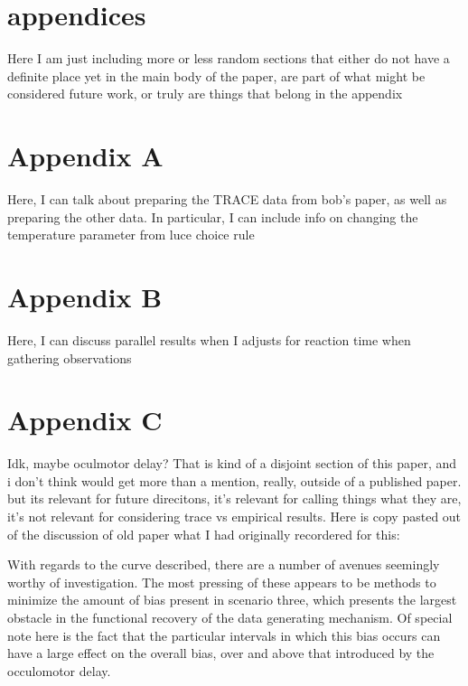\documentclass{article}
\begin{document}

\section{appendices}

Here  I am just including more or less random sections that either do not have a definite place yet in the main body of the paper, are part of what might be considered future work, or truly are things that belong in the appendix

\section*{Appendix A}
Here, I can talk about preparing the TRACE data from bob's paper, as well as preparing the other data. In particular, I can include info on changing the temperature parameter from luce choice rule

\section*{Appendix B}

Here, I can discuss parallel results when I adjusts for reaction time when gathering observations

\section*{Appendix C}

Idk, maybe oculmotor delay? That is kind of a disjoint section of this paper, and i don't think would get more than a mention, really, outside of a published paper. but its relevant for future direcitons, it's relevant for calling things what they are, it's not relevant for considering trace vs empirical results. Here is copy pasted out of the discussion of old paper what I had originally recordered for this:

With regards to the curve described, there are a number of avenues seemingly worthy of investigation. The most pressing of these appears to be methods to minimize the amount of bias present in scenario three, which presents the largest obstacle in the functional recovery of the data generating mechanism. Of special note here is the fact that the particular intervals in which this bias occurs can have a large effect on the overall bias, over and above that introduced by the occulomotor delay. 
\end{document}

